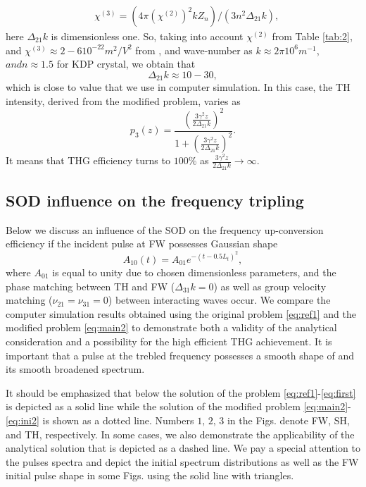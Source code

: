 \documentclass[a4paper, 12pt, onecolumn]{extarticle}
\begin{document}
\begin{equation}
\label{eq:coef1}
\begin{aligned}
&\chi^{(3)}=(4\pi(\chi^{(2)})^2k Z_n)/(3n^2\Delta_{21}{k}),
\end{aligned}
\end{equation}
here $\Delta_{21} k$ is dimensionless one. So, taking into account $\chi^{(2)}$ from Table \eqref{tab:2}, and $\chi^{(3)}\approx 2-6 10^{-22} m^2/V^2$ from \cite{bib:gan}, and wave-number as $k\approx 2\pi 10^6 m^{-1}$, $ and  n\approx 1.5$ for KDP crystal, we obtain that
$$
\Delta_{21}k\approx 10-30,
$$
which is close to value that we use in computer simulation.  In this case, the TH intensity, derived from the modified problem, varies as
$$
p_3(z)=\frac{\left(\frac{3\gamma^2 z}{2\Delta_{21}k}\right)^2}{1+\left(\frac{3\gamma^2 z}{2\Delta_{21}k}\right)^2}.
$$
It means that THG efficiency turns to $100\%$ as $  \frac{3\gamma^2 z}{2\Delta_{21}k}\rightarrow\infty$. 

\subsection*{SOD influence on the frequency tripling}

Below we discuss an influence of the SOD on the frequency up-conversion efficiency if the incident  pulse at FW possesses Gaussian shape 
\begin{equation}
A_{10}(t)=A_{01}e^{-(t-0.5L_t)^2},
\end{equation}
where \(A_{01}\) is equal to unity due to chosen dimensionless parameters, and the phase matching between TH and FW (\(\Delta_{31}k=0\)) as well as  group velocity matching (\(\nu_{21}=\nu_{31}=0\)) between interacting waves occur. We compare the computer simulation results obtained using the original problem \eqref{eq:ref1} and the modified problem \eqref{eq:main2} to demonstrate both a validity of the analytical consideration and a possibility for the high efficient THG achievement. It is important that a pulse at the trebled frequency possesses a smooth shape of  and its smooth broadened spectrum.

 
It should be emphasized that below the solution of the problem \eqref{eq:ref1}-\eqref{eq:first} is depicted as a solid line while the solution of the modified problem  \eqref{eq:main2}-\eqref{eq:ini2} is shown as a dotted line.  Numbers \(1,\,2,\,3\) in the Figs. denote FW, SH, and TH, respectively. In some cases, we also demonstrate the applicability of the analytical solution that is depicted as a dashed line. We pay a special attention to the pulses spectra and depict the initial spectrum distributions as well as the FW initial pulse shape in some Figs. using the solid line with triangles.
\end{document}
